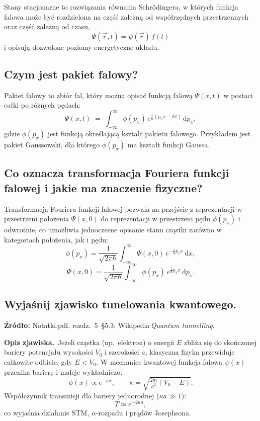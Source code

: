 Stany stacjonarne to rozwiązania równania Schrödingera, w których funkcja falowa może być rozdzielona na część zależną od współrzędnych przestrzennych oraz część zależną od czasu,
\[
\Psi(\vec r, t) = \psi(\vec r)\,f(t)
\]
i opisują dozwolone poziomy energetyczne układu.

\subsection{Czym jest pakiet falowy?}

Pakiet falowy to zbiór fal, który można opisać funkcją falową \(\Psi(x,t)\) w postaci całki po różnych pędach:
\[
\Psi(x,t)\;=\;\int_{-\infty}^{\infty}\!\phi(p_x)\,e^{\tfrac{i}{\hbar}(p_x x - E t)}\,\mathrm{d}p_x,
\]
gdzie \(\phi(p_x)\) jest funkcją określającą kształt pakietu falowego.  
Przykładem jest pakiet Gaussowski, dla którego \(\phi(p_x)\) ma kształt funkcji Gaussa.

\subsection{Co oznacza transformacja Fouriera funkcji falowej i jakie ma znaczenie fizyczne?}

Transformacja Fouriera funkcji falowej pozwala na przejście z reprezentacji w przestrzeni położenia \(\Psi(x,0)\) do reprezentacji w przestrzeni pędu \(\phi(p_x)\) i odwrotnie, co umożliwia jednoczesne opisanie stanu cząstki zarówno w kategoriach położenia, jak i pędu:
\[
\phi(p_x)
=\frac{1}{\sqrt{2\pi\hbar}}
\int_{-\infty}^{\infty}
\Psi(x,0)\,e^{-\frac{i}{\hbar}p_x x}\,\mathrm{d}x,
\]
\[
\Psi(x,0)
=\frac{1}{\sqrt{2\pi\hbar}}
\int_{-\infty}^{\infty}
\phi(p_x)\,e^{\frac{i}{\hbar}p_x x}\,\mathrm{d}p_x.
\]

\subsection{Wyjaśnij zjawisko tunelowania kwantowego.}

\textbf{Źródło:} Notatki.pdf, rozdz.~5~\S5.3; Wikipedia\,\emph{Quantum tunnelling}.
		
		\vspace{4pt}
		\textbf{Opis zjawiska.}\  
		Jeżeli cząstka (np.~elektron) o energii $E$ zbliża się do skończonej bariery
		potencjału wysokości $V_0$ i szerokości $a$, klasyczna fizyka
		przewiduje całkowite odbicie, gdy $E<V_0$.
		W mechanice kwantowej funkcja falowa $\psi(x)$ przenika barierę i maleje
		wykładniczo:
		\[
		\psi(x)\propto e^{-\kappa x},\qquad \kappa=\sqrt{\tfrac{2m}{\hbar^{2}}(V_0-E)}.
		\]
		Współczynnik transmisji dla bariery jednorodnej ($\kappa a\gg1$):
		\[
		T\simeq e^{-2\kappa a},
		\]
		co wyjaśnia działanie STM, $\alpha$-rozpadu i prądów Josephsona.
		
